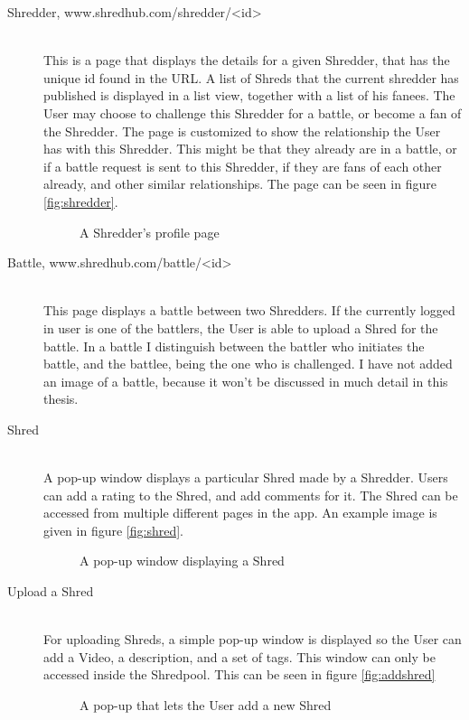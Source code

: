 \begin{description}
\item [Shredder, www.shredhub.com/shredder/<id>] \hfill \\
This is a page that displays the details for a given Shredder, that has the unique id found in the URL. A list of Shreds that the current shredder has published is displayed in a list view, together with a list of his fanees. The User may choose to challenge this Shredder for a battle, or become a fan of the Shredder. The page is customized to show the relationship the User has with this Shredder. This might be that they already are in a battle, or if a battle request is sent to this Shredder, if they are fans of each other already, and other similar relationships. The page can be seen in figure \vref{fig:shredder}.

\begin{figure}
  \begin{center}
\end{center}
\caption{A Shredder's profile page}\label{fig:shredder}
\end{figure}
		
\item [Battle, www.shredhub.com/battle/<id>] \hfill \\
This page displays a battle between two Shredders. If the currently logged in user is one of the battlers, the User is able to upload a Shred for the battle. In a battle I distinguish between the battler who initiates the battle, and the battlee, being the one who is challenged. I have not added an image of a battle, because it won't be discussed in much detail in this thesis.

\item[Shred] \hfill \\
A pop-up window displays a particular Shred made by a Shredder. Users can add a rating to the Shred, and add comments for it. The Shred can be accessed from multiple different pages in the app. An example image is given in figure \vref{fig:shred}.
\begin{figure}
  \begin{center}
\end{center}
\caption{A pop-up window displaying a Shred}\label{fig:shred}
\end{figure}

\item[Upload a Shred] \hfill \\
For uploading Shreds, a simple pop-up window is displayed so the User can add a Video, a description, and a set of tags. This window can only be accessed inside the Shredpool. This can be seen in figure \vref{fig:addshred}

\begin{figure}
  \begin{center}
\end{center}
\caption{A pop-up that lets the User add a new Shred}\label{fig:addshred}
\end{figure}

\end{description}
		
